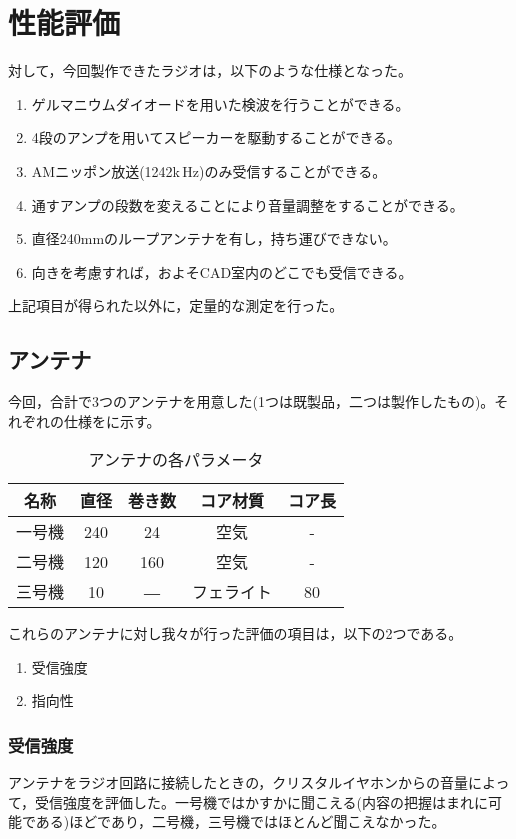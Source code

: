 \documentclass[report.tex]{subfiles}
\begin{document}
\section{性能評価}

対して，今回製作できたラジオは，以下のような仕様となった。
\begin{enumerate}
  \item ゲルマニウムダイオードを用いた検波を行うことができる。
  \item 4段のアンプを用いてスピーカーを駆動することができる。
  \item AMニッポン放送(1242k\,Hz)のみ受信することができる。
  \item 通すアンプの段数を変えることにより音量調整をすることができる。
  \item 直径240mmのループアンテナを有し，持ち運びできない。
  \item 向きを考慮すれば，およそCAD室内のどこでも受信できる。
\end{enumerate}

上記項目が得られた以外に，定量的な測定を行った。
\subsection{アンテナ}
今回，合計で3つのアンテナを用意した(1つは既製品，二つは製作したもの)。それぞれの仕様をに示す。

\begin{table}[h]
	\centering
	\caption{アンテナの各パラメータ}
	\label{tab:ant}
	\begin{tabular}{ccccc} \hline
		
		名称&直径&巻き数&コア材質&コア長\\ \hline \hline
		一号機&240&24&空気&-\\
		二号機&120&160&空気&-\\
		三号機&10&―&フェライト&80\\ \hline

	\end{tabular}
\end{table}

これらのアンテナに対し我々が行った評価の項目は，以下の2つである。
\begin{enumerate}
  \item 受信強度
  \item 指向性
\end{enumerate}

\subsubsection{受信強度}
アンテナをラジオ回路に接続したときの，クリスタルイヤホンからの音量によって，受信強度を評価した。一号機ではかすかに聞こえる(内容の把握はまれに可能である)ほどであり，二号機，三号機ではほとんど聞こえなかった。
\end{document}
